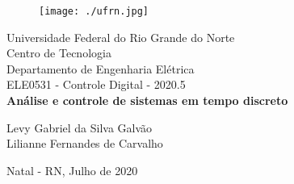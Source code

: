 \onehalfspacing
\begin{titlepage}
	\begin{center}
	
	\begin{figure}[!ht]
	\centering
	\texttt{[image: ./ufrn.jpg]}
	\end{figure}
		Universidade Federal do Rio Grande do Norte \\ Centro de Tecnologia \\ Departamento de Engenharia Elétrica \\ ELE0531 - Controle Digital - 2020.5 \\
		\vspace{15pt}
        \vspace{95pt}
        \textbf{\Large{Análise e controle de sistemas em tempo discreto}}\\
		\vspace{3,5cm}
	\end{center}
	
	\begin{flushright}
			\item Levy Gabriel da Silva Galvão \\ Lilianne Fernandes de Carvalho \\
 	\end{flushright}
	\vspace{1cm}
	
	\begin{center}
		\vspace{\fill}
		Natal - RN, Julho de 2020
	\end{center}
\end{titlepage}




